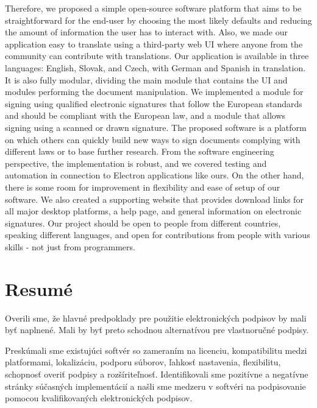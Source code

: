 \documentclass[thesismargins, english, thesislinespacing, onelinechapterstyle, upjsfrontpage]{rnthesis}
\begin{document}
Therefore, we proposed a simple open-source software platform that aims to be straightforward for the end-user by choosing the most likely defaults and reducing the amount of information the user has to interact with.
Also, we made our application easy to translate using a third-party web UI where anyone from the community can contribute with translations.
Our application is available in three languages: English, Slovak, and Czech, with German and Spanish in translation.
It is also fully modular, dividing the main module that contains the UI and modules performing the document manipulation.
We implemented a module for signing using qualified electronic signatures that follow the European standards and should be compliant with the European law, and a module that allows signing using a scanned or drawn signature.
The proposed software is a platform on which others can quickly build new ways to sign documents complying with different laws or to base further research.
From the software engineering perspective, the implementation is robust, and we covered testing and automation in connection to Electron applications like ours.
On the other hand, there is some room for improvement in flexibility and ease of setup of our software.
We also created a supporting website that provides download links for all major desktop platforms, a help page, and general information on electronic signatures.
Our project should be open to people from different countries, speaking different languages, and open for contributions from people with various skills - not just from programmers.

\chapter*{Resumé}

Overili sme, že hlavné predpoklady pre použitie elektronických podpisov by mali byť naplnené.
Mali by byť preto schodnou alternatívou pre vlastnoručné podpisy.

Preskúmali sme existujúci softvér so zameraním na licenciu, kompatibilitu medzi platformami, lokalizáciu, podporu súborov, ľahkosť nastavenia, flexibilitu, schopnosť overiť podpisy a rozšíriteľnosť.
Identifikovali sme pozitívne a negatívne stránky súčasných implementácií a našli sme medzeru v softvéri na podpisovanie pomocou kvalifikovaných elektronických podpisov.
\end{document}
